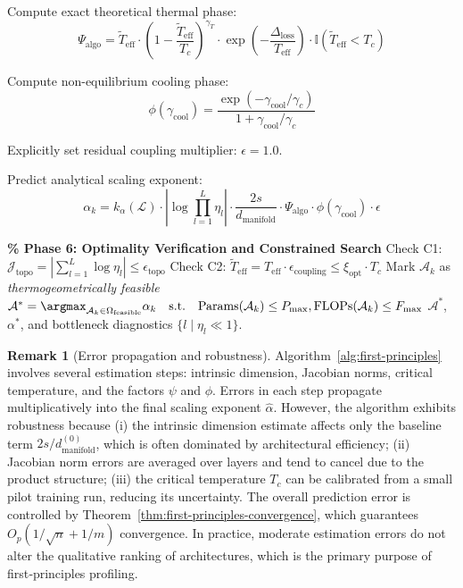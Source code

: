 \documentclass[11pt, a4paper]{article}
\theoremstyle{definition}
\newtheorem{remark}{Remark}[section]
\begin{document}
\begin{algorithm}[htbp]
\begin{algorithmic}[1]
 \STATE Compute exact theoretical thermal phase: 
 \[ \Psi_{\text{algo}} = \tilde{T}_{\text{eff}} \cdot \left(1 - \frac{\tilde{T}_{\text{eff}}}{T_c}\right)^{\gamma_T} \cdot \exp\left(-\frac{\Delta_{\text{loss}}}{T_{\text{eff}}}\right) \cdot \mathbb{I}(\tilde{T}_{\text{eff}} < T_c) \]
 
 \STATE Compute non-equilibrium cooling phase: 
 \[ \phi(\gamma_{\text{cool}}) = \frac{\exp(-\gamma_{\text{cool}}/\gamma_c)}{1 + \gamma_{\text{cool}}/\gamma_c} \]
 
 \STATE Explicitly set residual coupling multiplier: $\epsilon = 1.0$.
 
 \STATE Predict analytical scaling exponent: 
 \[ \alpha_k = k_\alpha(\mathcal{L}) \cdot \left|\log\prod_{l=1}^L\eta_l\right| \cdot \frac{2s}{d_{\text{manifold}}} \cdot \Psi_{\text{algo}} \cdot \phi(\gamma_{\text{cool}}) \cdot \epsilon \]
\ENDFOR

\STATE \textbf{\% Phase 6: Optimality Verification and Constrained Search}
\STATE Check C1: $\mathcal{J}_{\text{topo}} = \left|\sum_{l=1}^L \log \eta_l\right| \leq \epsilon_{\text{topo}}$
\STATE Check C2: $\tilde{T}_{\text{eff}} = T_{\text{eff}} \cdot \epsilon_{\text{coupling}} \leq \xi_{\text{opt}} \cdot T_c$
 \STATE Mark $\mathcal{A}_k$ as \emph{thermogeometrically feasible}
\ENDIF
\STATE $\mathcal{A}^* = \argmax_{\mathcal{A}_k \in \Omega_{\text{feasible}}} \alpha_k \quad \text{s.t.} \quad \text{Params}(\mathcal{A}_k) \le P_{\max}, \text{FLOPs}(\mathcal{A}_k) \le F_{\max}$
\RETURN $\mathcal{A}^*$, $\alpha^*$, and bottleneck diagnostics $\{l \mid \eta_l \ll 1\}$.
\end{algorithmic}
\end{algorithm}

\begin{remark}[Error propagation and robustness]
Algorithm~\ref{alg:first-principles} involves several estimation steps: intrinsic dimension, Jacobian norms, critical temperature, and the factors $\psi$ and $\phi$. Errors in each step propagate multiplicatively into the final scaling exponent $\hat{\alpha}$. However, the algorithm exhibits robustness because (i) the intrinsic dimension estimate affects only the baseline term $2s/d_{\text{manifold}}^{(0)}$, which is often dominated by architectural efficiency; (ii) Jacobian norm errors are averaged over layers and tend to cancel due to the product structure; (iii) the critical temperature $T_c$ can be calibrated from a small pilot training run, reducing its uncertainty. The overall prediction error is controlled by Theorem~\ref{thm:first-principles-convergence}, which guarantees $O_p(1/\sqrt{n} + 1/m)$ convergence. In practice, moderate estimation errors do not alter the qualitative ranking of architectures, which is the primary purpose of first‑principles profiling.
\end{remark}
\end{document}
